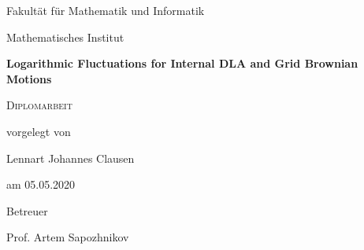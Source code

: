 \documentclass[11pt]{article}
\numberwithin{equation}{section}
\begin{document}
\begin{titlepage}
  \centering
  \par\vspace{1cm}{\LARGE Universität Leipzig \par}
  \vspace {0.3cm}
  {\Large Fakultät für Mathematik und Informatik\par}
  \vspace {0.3cm}
  {\Large Mathematisches Institut \par}     
  \vspace {2.0cm}
  {\huge\bfseries Logarithmic Fluctuations for Internal DLA
   and Grid Brownian Motions
   \par}
  \vspace {5.0cm}
  {\scshape\Large Diplomarbeit \par}
  \vspace {0.6cm}
  { vorgelegt von \par}
  \vspace {0.6cm}
  { \large Lennart Johannes Clausen \par}
  \vspace {0.6cm}
  { am 05.05.2020
  \par}
  \vspace {0.6cm}
  {Betreuer \par}
  \vspace{0.6cm}
  {Prof. Artem Sapozhnikov\par}
  \vfill
\end{titlepage}

\thispagestyle{empty}
\begin{center}
  \vspace{1cm} 
  \hspace{10pt}
  \begin{abstract}
    In my thesis I consider internal diffusion limited aggregation—a random growth model—on 
    the two-dimensional lattice.    
    With each step, a new particle starts in the origin and performs a random walk 
    until it hits an unoccupied lattice point, where it stops.   
    I am interested in the asymptotic growth of the occupied cluster. 
    Lawler, Bramson, and Griffeath \cite{lawler92} proved 
    that the asymptotic shape is a Euclidean ball. 
    This statement was remarkably improved by Jerison, Levine, and Sheffield \cite{jerison},
    who showed that the fluctuations from circularity are of logarithmic order. 
    This result is subject of my thesis. 
    I give a thorough overview of the proof by filling in the omitted details. One of
    the most technical steps that was left out in the paper and is filled in
    in this thesis is an extension of the classical result that a harmonic
    function of Brownian motion is a martingale to grid-harmonic functions
    and grid Brownian motions.
  \end{abstract}
  \vfill
\end{center}
\newpage
\end{document}
